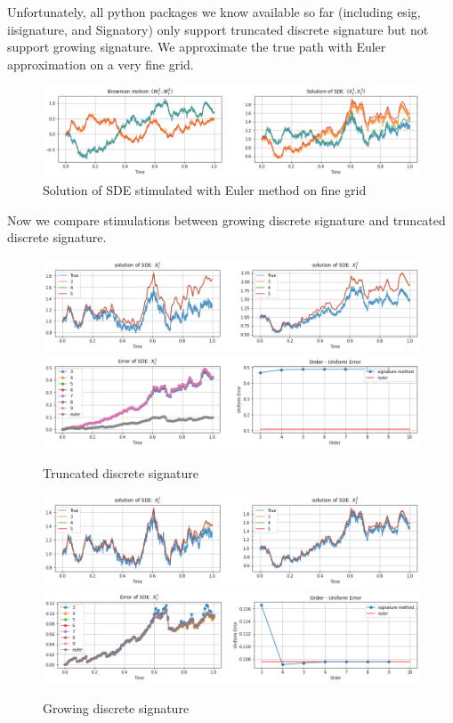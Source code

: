 \documentclass[12pt]{report}
\theoremstyle{definition}
\theoremstyle{remark}
\begin{document}
Unfortunately, all python packages we know available so far (including esig, iisignature, and Signatory) only support truncated discrete signature but not support growing signature. We approximate the true path with Euler approximation on a very fine grid.
\begin{figure}[H]
    \centering
    \includegraphics[width=\textwidth]{figs/sde1.png}
    \caption{Solution of SDE stimulated with Euler method on fine grid}
\end{figure}
Now we compare stimulations between growing discrete signature and truncated discrete signature.
\begin{figure}[H]
    \centering
    \includegraphics[width=\textwidth]{figs/sde2.png}
    \includegraphics[width=\textwidth]{figs/sde3.png}
    \caption{Truncated discrete signature}
\end{figure}
\begin{figure}[H]
    \centering
    \includegraphics[width=\textwidth]{figs/sde4.png}
    \includegraphics[width=\textwidth]{figs/sde5.png}
    \caption{Growing discrete signature}
\end{figure}
\end{document}

